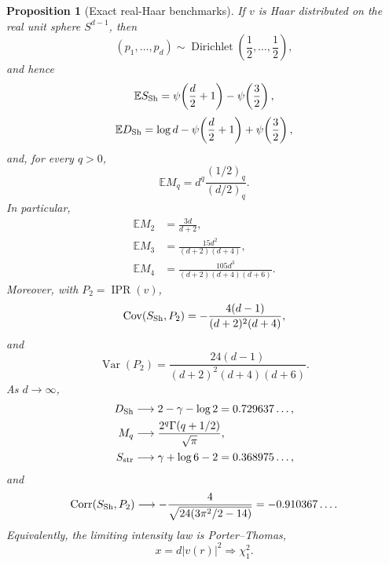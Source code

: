 \documentclass[11pt]{amsart}
\numberwithin{equation}{section}
\theoremstyle{plain}
\newtheorem{proposition}[theorem]{Proposition}
\theoremstyle{definition}
\theoremstyle{remark}
\newcommand{\IPR}{\operatorname{IPR}}
\begin{document}
\begin{proposition}[Exact real-Haar benchmarks]
\label{prop:haar_shannon_moments}
If $v$ is Haar distributed on the real unit sphere $S^{d-1}$, then
\begin{equation}
(p_1,\ldots,p_d)\sim
\operatorname{Dirichlet}\!\left(\frac12,\ldots,\frac12\right),
\label{eq:haar_dirichlet}
\end{equation}
and hence
\begin{equation}
\mathbb E S_{\rm Sh}
=\psi\!\left(\frac d2+1\right)-\psi\!\left(\frac32\right),
\label{eq:haar_shannon_exact}
\end{equation}
\begin{equation}
\mathbb E D_{\rm Sh}
=\log d-\psi\!\left(\frac d2+1\right)+\psi\!\left(\frac32\right),
\label{eq:haar_shannon_deficit_exact}
\end{equation}
and, for every $q>0$,
\begin{equation}
\mathbb E M_q
=d^q\frac{(1/2)_q}{(d/2)_q}.
\label{eq:haar_Mq_exact}
\end{equation}
In particular,
\begin{align}
\mathbb E M_2&=\frac{3d}{d+2},
\label{eq:haar_M2_exact}\\
\mathbb E M_3&=\frac{15d^2}{(d+2)(d+4)},
\label{eq:haar_M3_exact}\\
\mathbb E M_4&=\frac{105d^3}{(d+2)(d+4)(d+6)}.
\label{eq:haar_M4_exact}
\end{align}
Moreover, with $P_2=\IPR(v)$,
\begin{equation}
\operatorname{Cov}(S_{\rm Sh},P_2)
=-\frac{4(d-1)}{(d+2)^2(d+4)},
\label{eq:haar_shannon_ipr_cov}
\end{equation}
and
\begin{equation}
\operatorname{Var}(P_2)
=\frac{24(d-1)}{(d+2)^2(d+4)(d+6)}.
\label{eq:haar_ipr_variance}
\end{equation}
As $d\to\infty$,
\begin{align}
D_{\rm Sh}&\longrightarrow 2-\gamma-\log2=0.729637\ldots,
\label{eq:haar_shannon_limit}\\
M_q&\longrightarrow \frac{2^q\Gamma(q+1/2)}{\sqrt\pi},
\label{eq:haar_porter_thomas_moments}\\
S_{\rm str}&\longrightarrow \gamma+\log6-2=0.368975\ldots,
\label{eq:haar_structural_entropy_limit}
\end{align}
and
\begin{equation}
\operatorname{Corr}(S_{\rm Sh},P_2)
\longrightarrow
-\frac{4}{\sqrt{24(3\pi^2/2-14)}}
=-0.910367\ldots.
\label{eq:haar_shannon_ipr_corr_limit}
\end{equation}
Equivalently, the limiting intensity law is Porter--Thomas,
\begin{equation}
x=d|v(r)|^2\Longrightarrow\chi_1^2.
\label{eq:porter_thomas_intensity}
\end{equation}
\end{proposition}
\end{document}
